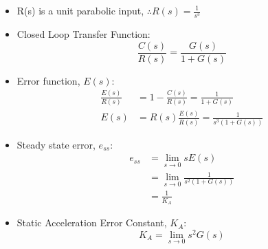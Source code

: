 \documentclass[a4paper]{article}
\begin{document}
\begin{itemize}
    \item R(s) is a unit parabolic input, $\therefore R(s) = \displaystyle\frac{1}{s^3}$
    \item Closed Loop Transfer Function:
    $$\frac{C(s)}{R(s)} = \frac{G(s)}{1+G(s)}$$
    \item Error function, $E(s)$:
    \begin{align*}
        \frac{E(s)}{R(s)} &= 1-\frac{C(s)}{R(s)} = \frac{1}{1+G(s)}\\
        E(s) &= R(s)\frac{E(s)}{R(s)} = \frac{1}{s^3(1+G(s))}
    \end{align*}
    \item Steady state error, $e_{ss}$:
     \begin{align*}
        e_{ss} &= \lim_{s\to 0}sE(s)\\
        &= \lim_{s\to 0}\frac{1}{s^2(1+G(s))}\\
        &= \frac{1}{K_A}
    \end{align*}
    \item Static Acceleration Error Constant, $K_A$:
    $$K_A = \lim_{s\to 0}s^2G(s)$$
\end{itemize}
\end{document}
